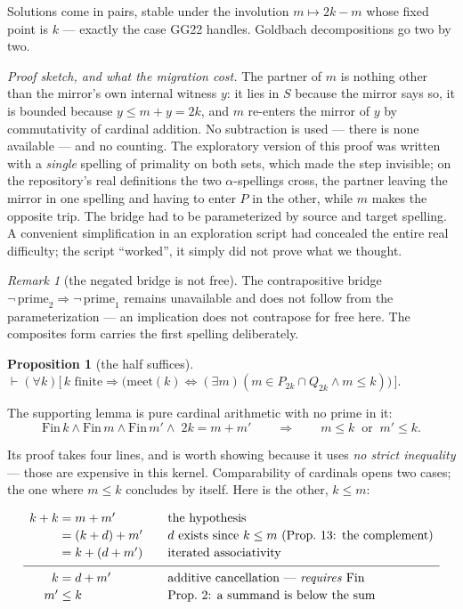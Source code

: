 \documentclass[11pt]{article}
\newtheorem{proposition}{Proposition}
\theoremstyle{remark}\newtheorem{remark}{Remark}
\begin{document}
Solutions come in pairs, stable under the involution $m \mapsto 2k - m$ whose fixed
point is $k$ --- exactly the case GG22 handles. Goldbach decompositions go two by two.

\emph{Proof sketch, and what the migration cost.} The partner of $m$ is nothing other
than the mirror's own internal witness $y$: it lies in $S$ because the mirror says so,
it is bounded because $y \le m + y = 2k$, and $m$ re-enters the mirror of $y$ by
commutativity of cardinal addition. No subtraction is used --- there is none available
--- and no counting. The exploratory version of this proof was written with a
\emph{single} spelling of primality on both sets, which made the step invisible; on the
repository's real definitions the two $\alpha$-spellings cross, the partner leaving the
mirror in one spelling and having to enter $P$ in the other, while $m$ makes the
opposite trip. The bridge had to be parameterized by source and target spelling. A
convenient simplification in an exploration script had concealed the entire real
difficulty; the script ``worked'', it simply did not prove what we thought.

\begin{remark}[the negated bridge is not free]
The contrapositive bridge $\neg\,\mathrm{prime}_2 \Rightarrow \neg\,\mathrm{prime}_1$
remains unavailable and does not follow from the parameterization --- an implication
does not contrapose for free here. The composites form carries the first spelling
deliberately.
\end{remark}

\begin{proposition}[the half suffices]
$\vdash (\forall k)\bigl[\,k \text{ finite} \Rightarrow
\bigl(\mathrm{meet}(k) \Leftrightarrow (\exists m)(m \in P_{2k} \cap Q_{2k} \wedge m \le k)\bigr)\,\bigr].$
\end{proposition}

The supporting lemma is pure cardinal arithmetic with no prime in it:
\[
\mathrm{Fin}\,k \wedge \mathrm{Fin}\,m \wedge \mathrm{Fin}\,m'
\wedge\; 2k = m + m'
\qquad\Longrightarrow\qquad
m \le k \;\;\text{or}\;\; m' \le k .
\]

Its proof takes four lines, and is worth showing because it uses \emph{no strict
inequality} --- those are expensive in this kernel. Comparability of cardinals opens two
cases; the one where $m \le k$ concludes by itself. Here is the other, $k \le m$:

\[
\begin{array}{r@{\;}c@{\;}l@{\qquad}l}
  k + k &=& m + m'      & \text{the hypothesis} \\[2pt]
        &=& (k + d) + m'& d \text{ exists since } k \le m \text{ (Prop.\ 13: the complement)} \\[2pt]
        &=& k + (d + m')& \text{iterated associativity} \\[4pt]
\hline \\[-8pt]
      k &=& d + m'      & \text{additive cancellation --- \emph{requires} } \mathrm{Fin} \\[2pt]
     m' &\le& k         & \text{Prop.\ 2: a summand is below the sum}
\end{array}
\]
\end{document}

